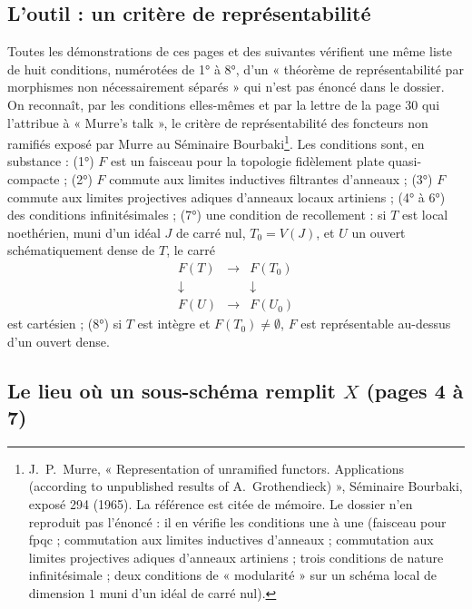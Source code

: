 \documentclass[11pt,a4paper]{article}
\begin{document}
\subsection*{L'outil : un critère de représentabilité}

Toutes les démonstrations de ces pages et des suivantes vérifient une même
liste de huit conditions, numérotées de 1° à 8°, d'un « théorème de
représentabilité par morphismes non nécessairement séparés » qui n'est pas
énoncé dans le dossier. On reconnaît, par les conditions elles-mêmes et par
la lettre de la page 30 qui l'attribue à « Murre's talk », le critère de
représentabilité des foncteurs non ramifiés exposé par Murre au Séminaire
Bourbaki\footnote{J.~P.~Murre, « Representation of unramified functors.
Applications (according to unpublished results of A.~Grothendieck) »,
Séminaire Bourbaki, exposé 294 (1965). La référence est citée de mémoire. Le
dossier n'en reproduit pas l'énoncé : il en vérifie les conditions une à une
(faisceau pour fpqc ; commutation aux limites inductives d'anneaux ;
commutation aux limites projectives adiques d'anneaux artiniens ; trois
conditions de nature infinitésimale ; deux conditions de « modularité » sur
un schéma local de dimension $1$ muni d'un idéal de carré nul).}. Les conditions
sont, en substance : (1°) $F$ est un faisceau pour la topologie fidèlement
plate quasi-compacte ; (2°) $F$ commute aux limites inductives filtrantes
d'anneaux ; (3°) $F$ commute aux limites projectives adiques d'anneaux locaux
artiniens ; (4° à 6°) des conditions infinitésimales ; (7°) une condition de
recollement : si $T$ est local noethérien, muni d'un idéal $J$ de carré nul,
$T_0 = V(J)$, et $U$ un ouvert schématiquement dense de $T$, le carré
\[
\begin{array}{ccc}
F(T) & \longrightarrow & F(T_0)\\
\downarrow & & \downarrow\\
F(U) & \longrightarrow & F(U_0)
\end{array}
\]
est cartésien ; (8°) si $T$ est intègre et $F(T_0) \neq \emptyset$, $F$ est
représentable au-dessus d'un ouvert dense.

\subsection*{Le lieu où un sous-schéma remplit $X$ (pages 4 à 7)}
\end{document}
